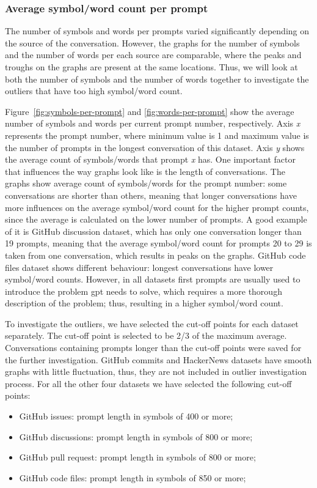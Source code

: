 \subsubsection{Average symbol/word count per prompt}
The number of symbols and words per prompts varied significantly depending on the source of the conversation. However, the graphs for the number of symbols and the number of words per each source are comparable, where the peaks and troughs on the graphs are present at the same locations. Thus, we will look at both the number of symbols and the number of words together to investigate the outliers that have too high symbol/word count.

Figure~\ref{fig:symbols-per-prompt} and \ref{fig:words-per-prompt} show the average number of symbols and words per current prompt number, respectively. Axis \textit{x} represents the prompt number, where minimum value is 1 and maximum value is the number of prompts in the longest conversation of this dataset. Axis \textit{y} shows the average count of symbols/words that prompt \textit{x} has. One important factor that influences the way graphs look like is the length of conversations. The graphs show average count of symbols/words for the prompt number: some conversations are shorter than others, meaning that longer conversations have more influences on the average symbol/word count for the higher prompt counts, since the average is calculated on the lower number of prompts. A good example of it is GitHub discussion dataset, which has only one conversation longer than 19 prompts, meaning that the average symbol/word count for prompts 20 to 29 is taken from one conversation, which results in peaks on the graphs. GitHub code files dataset shows different behaviour: longest conversations have lower symbol/word counts. However, in all datasets first prompts are usually used to introduce the problem \gls{gpt} needs to solve, which requires a more thorough description of the problem; thus, resulting in a higher symbol/word count.

To investigate the outliers, we have selected the cut-off points for each dataset separately. The cut-off point is selected to be 2/3 of the maximum average. Conversations containing prompts longer than the cut-off points were saved for the further investigation. GitHub commits and HackerNews datasets have smooth graphs with little fluctuation, thus, they are not included in outlier investigation process. For all the other four datasets we have selected the following cut-off points:
\begin{itemize}
    \item GitHub issues: prompt length in symbols of 400 or more;
    \item GitHub discussions: prompt length in symbols of 800 or more;
    \item GitHub pull request: prompt length in symbols of 800 or more;
    \item GitHub code files: prompt length in symbols of 850 or more;
\end{itemize}

